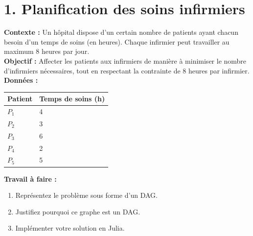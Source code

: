 \newpage

\section*{1. Planification des soins infirmiers}
\textbf{Contexte : } Un hôpital dispose d’un certain nombre de patients ayant chacun besoin d’un temps de soins (en heures).
Chaque infirmier peut travailler au maximum 8 heures par jour. \\

\textbf{Objectif : } Affecter les patients aux infirmiers de manière à minimiser le nombre d’infirmiers nécessaires, tout en respectant la contrainte de 8 heures par infirmier. \\

\textbf{Données :}

\begin{center}
\begin{tabular}{ll}
\toprule
\textbf{Patient} & \textbf{Temps de soins (h)}\\
\midrule
$P_1$ & 4 \\
$P_2$ & 3 \\
$P_3$ & 6 \\
$P_4$ & 2 \\
$P_5$ & 5 \\

\bottomrule
\end{tabular}
\end{center}

\textbf{Travail à faire :} \\
\begin{enumerate}
    \item Représentez le problème sous forme d’un DAG.
    \item Justifiez pourquoi ce graphe est un DAG.
    \item Implémenter votre solution en Julia.
\end{enumerate}






